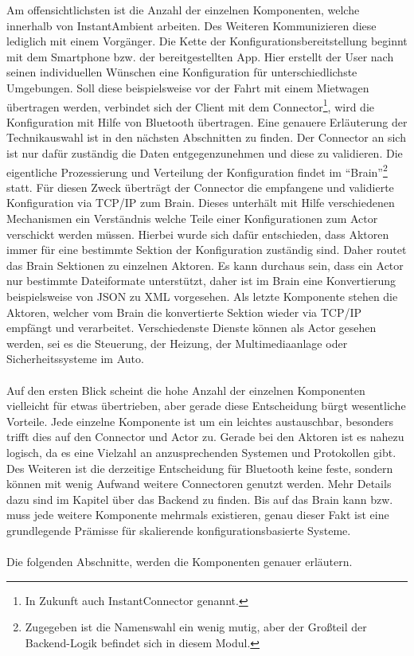 Am offensichtlichsten ist die Anzahl der einzelnen Komponenten, welche innerhalb von InstantAmbient arbeiten. Des Weiteren Kommunizieren diese lediglich mit einem Vorgänger. Die Kette der Konfigurationsbereitstellung beginnt mit dem Smartphone bzw. der bereitgestellten App. Hier erstellt der User nach seinen individuellen Wünschen eine Konfiguration für unterschiedlichste Umgebungen. Soll diese beispielsweise vor der Fahrt mit einem Mietwagen übertragen werden, verbindet sich der Client mit dem Connector\footnote{In Zukunft auch InstantConnector genannt.}, wird die Konfiguration mit Hilfe von Bluetooth übertragen. Eine genauere Erläuterung der Technikauswahl ist in den nächsten Abschnitten zu finden. Der Connector an sich ist nur dafür zuständig die Daten entgegenzunehmen und diese zu validieren. Die eigentliche Prozessierung und Verteilung der Konfiguration findet im "`Brain"'\footnote{Zugegeben ist die Namenswahl ein wenig mutig, aber der Großteil der Backend-Logik befindet sich in diesem Modul.} statt. Für diesen Zweck überträgt der Connector die empfangene und validierte Konfiguration via TCP/IP zum Brain. Dieses unterhält mit Hilfe verschiedenen Mechanismen ein Verständnis welche Teile einer Konfigurationen zum Actor verschickt werden müssen. Hierbei wurde sich dafür entschieden, dass Aktoren immer für eine bestimmte Sektion der Konfiguration zuständig sind. Daher routet das Brain Sektionen zu einzelnen Aktoren. Es kann durchaus sein, dass ein Actor nur bestimmte Dateiformate unterstützt, daher ist im Brain eine Konvertierung beispielsweise von JSON zu XML vorgesehen.
Als letzte Komponente stehen die Aktoren, welcher vom Brain die konvertierte Sektion wieder via TCP/IP empfängt und verarbeitet. Verschiedenste Dienste können als Actor gesehen werden, sei es die Steuerung, der Heizung, der Multimediaanlage oder Sicherheitssysteme im Auto.
\\\\
Auf den ersten Blick scheint die hohe Anzahl der einzelnen Komponenten vielleicht für etwas übertrieben, aber gerade diese Entscheidung bürgt wesentliche Vorteile. Jede einzelne Komponente ist um ein leichtes austauschbar, besonders trifft dies auf den Connector und Actor zu. Gerade bei den Aktoren ist es nahezu logisch, da es eine Vielzahl an anzusprechenden Systemen und Protokollen gibt. Des Weiteren ist die derzeitige Entscheidung für Bluetooth keine feste, sondern können mit wenig Aufwand weitere Connectoren genutzt werden. Mehr Details dazu sind im Kapitel über das Backend zu finden. Bis auf das Brain kann bzw. muss jede weitere Komponente mehrmals existieren, genau dieser Fakt ist eine grundlegende Prämisse für skalierende konfigurationsbasierte Systeme. 
\\\\
Die folgenden Abschnitte, werden die Komponenten genauer erläutern.


